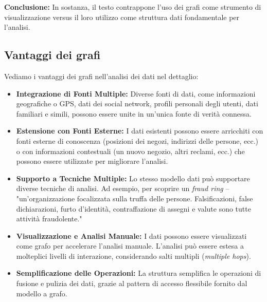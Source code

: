 \vspace{0.5cm}

\noindent \textbf{Conclusione:} In sostanza, il testo contrappone l'uso dei grafi come strumento di visualizzazione versus il loro utilizzo come struttura dati fondamentale per l'analisi.

\newpage
\subsection{Vantaggi dei grafi}
Vediamo i vantaggi dei grafi nell'analisi dei dati nel dettaglio:
\begin{itemize}
    \item \textbf{Integrazione di Fonti Multiple:} Diverse fonti di dati, come informazioni geografiche o GPS, dati dei social network, profili personali degli utenti, dati familiari e simili, possono essere unite in un'unica fonte di verità connessa.
    
    \item \textbf{Estensione con Fonti Esterne:} I dati esistenti possono essere arricchiti con fonti esterne di conoscenza (posizioni dei negozi, indirizzi delle persone, ecc.) o con informazioni contestuali (un nuovo negozio, altri reclami, ecc.) che possono essere utilizzate per migliorare l'analisi.
    
    \item \textbf{Supporto a Tecniche Multiple:} Lo stesso modello dati può supportare diverse tecniche di analisi. Ad esempio, per scoprire un \textit{fraud ring} -- "un'organizzazione focalizzata sulla truffa delle persone. Falsificazioni, false dichiarazioni, furto d'identità, contraffazione di assegni e valute sono tutte attività fraudolente."
    
    \item \textbf{Visualizzazione e Analisi Manuale:} I dati possono essere visualizzati come grafo per accelerare l'analisi manuale. L'analisi può essere estesa a molteplici livelli di interazione, considerando salti multipli (\textit{multiple hops}).
    
    \item \textbf{Semplificazione delle Operazioni:} La struttura semplifica le operazioni di fusione e pulizia dei dati, grazie al pattern di accesso flessibile fornito dal modello a grafo.
\end{itemize}

